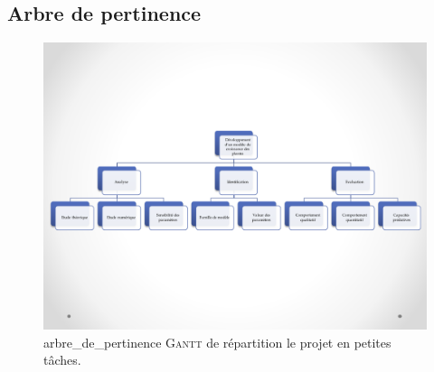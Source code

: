 \subsection{Arbre de pertinence}
\begin{figure}[h]
  \includegraphics[scale=0.51]{./annexes/arbre_de_pertinence.pdf}
  \caption{arbre_de_pertinence \textsc{Gantt} de répartition le projet en petites tâches.}
  \label{fig:arbre_de_pertinence}
\end{figure}